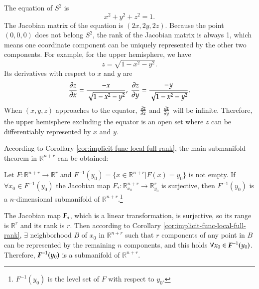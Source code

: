 \documentclass[11pt, a4paper]{book}
\begin{document}
\begin{Example}
  The equation of $S^2$ is
  \begin{equation*}
    x^2 + y^2 + z^2 = 1.
  \end{equation*}
  The Jacobian matrix of the equation is $(2x, 2y, 2z)$. Because the point $(0,0,0)$ does
  not belong $S^2$, the rank of the Jacobian matrix is always 1, which means one coordinate
  component can be uniquely represented by the other two components. For example, for the
  upper hemisphere, we have
  \begin{equation*}
    z = \sqrt{1 - x^2 - y^2}.
  \end{equation*}
  Its derivatives with respect to $x$ and $y$ are
  \begin{equation*}
    \frac{\partial z}{\partial x} = \frac{-x}{\sqrt{1 - x^2 - y^2}}, \; \frac{\partial z}{\partial
      y} = \frac{-y}{\sqrt{1 - x^2 - y^2}}.
  \end{equation*}
  When $(x,y,z)$ approaches to the equator, $\frac{\partial z}{\partial x}$ and
  $\frac{\partial z}{\partial y}$ will be infinite. Therefore, the upper hemisphere excluding
  the equator is an open set where $z$ can be differentiably represented by $x$ and $y$.
\end{Example}

According to Corollary \ref{cor:implicit-func-local-full-rank}, the main submanifold
theorem in $\mathbb{R}^{n+r}$ can be obtained:

\begin{Theorem}
  Let $F: \mathbb{R}^{n+r} \rightarrow \mathbb{R}^r$ and
  $F^{-1}(y_0) = \{x \in \mathbb{R}^{n+r} \vert F(x) = y_0\}$ is not empty. If
  $\forall x_0 \in F^{-1}(y_0)$ the Jacobian map
  $F_{*}: \mathbb{R}_{x_0}^{n+r} \rightarrow \mathbb{R}_{y_0}^r$ is surjective, then
  $F^{-1}(y_0)$ is a $n$-dimensional submanifold of
  $\mathbb{R}^{n+r}$.\footnote{$F^{-1}(y_0)$ is the level set of $F$ with respect to
    $y_0$.}
\end{Theorem}

\begin{Proof}
  The Jacobian map $\boldsymbol{F}_{*}$, which is a linear transformation, is surjective, so its
  range is $\mathbb{R}^r$ and its rank is $r$. Then according to Corollary
  \ref{cor:implicit-func-local-full-rank}, $\exists$ neighborhood $B$ of $x_0$ in
  $\mathbb{R}^{n+r}$ such that $r$ components of any point in $B$ can be represented by
  the remaining $n$ components, and this holds $\forall x_0 \in \boldsymbol{F}^{-1}(y_0)$.
  Therefore, $\boldsymbol{F}^{-1}(y_0)$ is a submanifold of $\mathbb{R}^{n+r}$.
\end{Proof}
\end{document}
